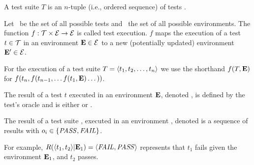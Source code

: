 \begin{definition}
A test suite\/ $T$ is an $n$-tuple (i.e., ordered sequence) of tests
.

\end{definition}

\begin{definition}
Let\/ \alltests\ be the set of all possible
tests and\/ \environs\ the set of all possible
environments.
The function\/ ${f}: \mathcal{T} \times \mathcal{E} \rightarrow
\mathcal{E}$ is called test
execution. $f$ maps the execution of a test\/ $ t \in
\mathcal{T}$ 
in an environment\/ $\mathbf{E} \in \mathcal{E}$ to a new (potentially updated)
environment\/ $\mathbf{E}' \in \mathcal{E}$.

For the execution of a test suite\/ $T =  \langle t_1, t_2, \dots, t_n \rangle $
we use the shorthand\/
$f(T,\mathbf{E})$ for $f(t_n,f(t_{n-1},\dots f(t_1,\mathbf{E}) \dots ))$.
\end{definition}

\begin{definition}
The result of a test $t$ executed in an environment\/ $\mathbf{E}$,
denoted\/ , is defined by the test's oracle
and is either \pass or \fail.

The result of a test suite\/ , executed in an
environment\/ \env, denoted\/  is a
sequence of results\/  with $o_i \in \{\mathit{PASS},\mathit{FAIL}\}$.


For example, $R( \langle t_1, t_2 \rangle |\mathbf{E}_1) =  \langle \mathit{FAIL}, \mathit{PASS} \rangle $ represents that 
$t_1$ fails given the environment\/ $\mathbf{E}_1$, and\/ $t_2$ passes.
\end{definition}




